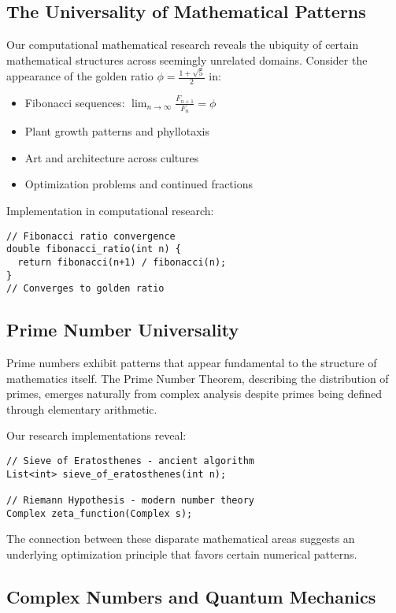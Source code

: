 \documentclass[12pt]{article}
\begin{document}
\subsection{The Universality of Mathematical Patterns}

Our computational mathematical research reveals the ubiquity of certain mathematical structures across seemingly unrelated domains. Consider the appearance of the golden ratio $\phi = \frac{1+\sqrt{5}}{2}$ in:

\begin{itemize}
\item Fibonacci sequences: $\lim_{n \to \infty} \frac{F_{n+1}}{F_n} = \phi$
\item Plant growth patterns and phyllotaxis
\item Art and architecture across cultures
\item Optimization problems and continued fractions
\end{itemize}

Implementation in computational research:

\begin{verbatim}
// Fibonacci ratio convergence
double fibonacci_ratio(int n) {
  return fibonacci(n+1) / fibonacci(n);
}
// Converges to golden ratio
\end{verbatim}

\subsection{Prime Number Universality}

Prime numbers exhibit patterns that appear fundamental to the structure of mathematics itself. The Prime Number Theorem, describing the distribution of primes, emerges naturally from complex analysis despite primes being defined through elementary arithmetic.

Our research implementations reveal:

\begin{verbatim}
// Sieve of Eratosthenes - ancient algorithm
List<int> sieve_of_eratosthenes(int n);

// Riemann Hypothesis - modern number theory
Complex zeta_function(Complex s);
\end{verbatim}

The connection between these disparate mathematical areas suggests an underlying optimization principle that favors certain numerical patterns.

\subsection{Complex Numbers and Quantum Mechanics}
\end{document}
